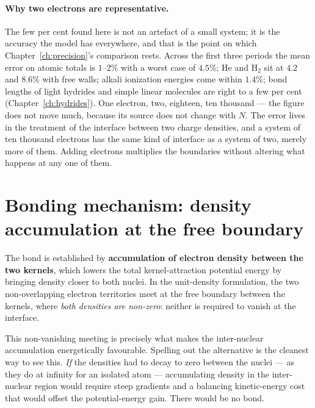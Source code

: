 \paragraph{Why two electrons are representative.}
The few per cent found here is not an artefact of a small system; it is the accuracy the model has
everywhere, and that is the point on which Chapter~\ref{ch:precision}'s comparison rests. Across
the first three periods the mean error on atomic totals is $1$--$2\%$ with a worst case of $4.5\%$;
He and H$_2$ sit at $4.2$ and $8.6\%$ with free walls; alkali ionization energies come
within $1.4\%$; bond lengths of light hydrides and simple linear molecules are
right to a few per cent (Chapter~\ref{ch:hydrides}). One electron, two, eighteen, ten thousand --- the figure does not move
much, because its source does not change with $N$. The error lives in the treatment of the
interface between two charge densities, and a system of ten thousand electrons has the same kind of
interface as a system of two, merely more of them. Adding electrons multiplies the boundaries
without altering what happens at any one of them.

\section{Bonding mechanism: density accumulation at the free boundary}\label{sec:bonding-mechanism}

The bond is established by \textbf{accumulation of electron density between the two kernels}, which lowers the total kernel-attraction potential energy by bringing density closer to both nuclei. In the unit-density formulation, the two non-overlapping electron territories meet at the free boundary between the kernels, where \emph{both densities are non-zero}: neither is required to vanish at the interface.

This non-vanishing meeting is precisely what makes the inter-nuclear accumulation energetically favourable. Spelling out the alternative is the cleanest way to see this. \emph{If} the densities had to decay to zero between the nuclei --- as they do at infinity for an isolated atom --- accumulating density in the inter-nuclear region would require steep gradients and a balancing kinetic-energy cost that would offset the potential-energy gain. There would be no bond.

